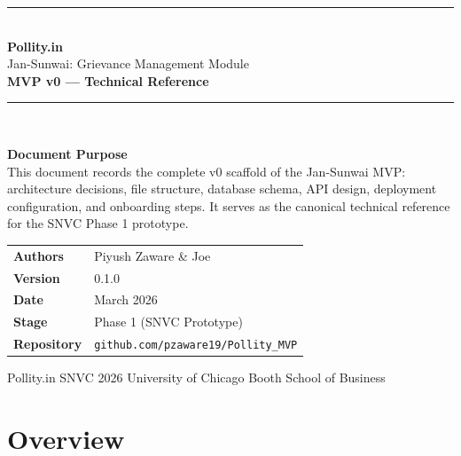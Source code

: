 \documentclass[11pt, a4paper]{article}
\begin{document}
\begin{titlepage}
\centering
\vspace*{2cm}
{\color{pollityblue}\rule{\linewidth}{1.5pt}}\\[0.4cm]
{\Huge\bfseries\color{pollityblue} Pollity.in}\\[0.3cm]
{\Large\color{gray} Jan-Sunwai: Grievance Management Module}\\[0.2cm]
{\large\bfseries MVP v0 — Technical Reference}\\[0.2cm]
{\color{pollityblue}\rule{\linewidth}{1.5pt}}\\[1.5cm]

\begin{tcolorbox}[colback=pollityblue!8, colframe=pollityblue, sharp corners, width=0.85\linewidth]
\centering
\textbf{Document Purpose}\\[0.3em]
This document records the complete v0 scaffold of the Jan-Sunwai MVP:
architecture decisions, file structure, database schema, API design,
deployment configuration, and onboarding steps.
It serves as the canonical technical reference for the SNVC Phase 1 prototype.
\end{tcolorbox}

\vspace{1.5cm}

\begin{tabular}{ll}
\toprule
\textbf{Authors}    & Piyush Zaware \& Joe \\
\textbf{Version}    & 0.1.0 \\
\textbf{Date}       & March 2026 \\
\textbf{Stage}      & Phase 1 (SNVC Prototype) \\
\textbf{Repository} & \texttt{github.com/pzaware19/Pollity\_MVP} \\
\bottomrule
\end{tabular}

\vfill
{\small\color{gray} Pollity.in \textbar{} SNVC 2026 \textbar{} University of Chicago Booth School of Business}
\end{titlepage}

\tableofcontents
\newpage

\section{Overview}
\end{document}

